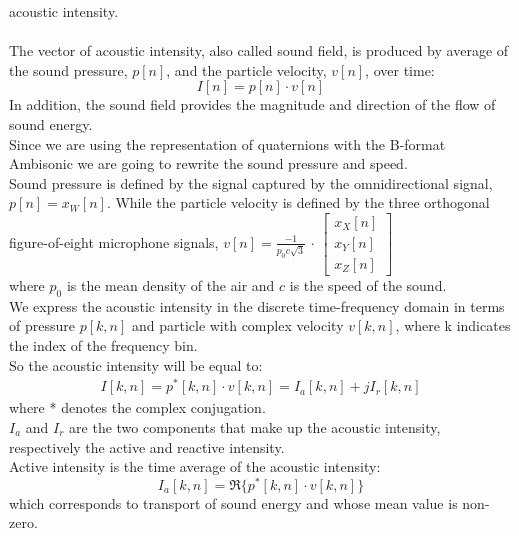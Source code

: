 \documentclass{article}
\begin{document}
    acoustic intensity.
    \\ \\ The vector of acoustic intensity, also called sound field, is produced by average of the sound pressure, $p[n]$, and
    the particle velocity, $v[n]$, over time:
    \begin{equation*}
        I[n]=p[n] \cdot v[n]
    \end{equation*}
    In addition, the sound field provides the magnitude and direction of the flow of sound energy.
    \\ Since we are using the representation of quaternions with the B-format Ambisonic we are going to rewrite the sound 
    pressure and speed.
    \\ Sound pressure is defined by the signal captured by the omnidirectional signal, $p[n] = x_W[n]$.
    While the particle velocity is defined by the three orthogonal figure-of-eight microphone signals, $v[n]= \frac{-1}{p_0c\sqrt{3}}$ $\cdot$
    $\begin{bmatrix}
            x_X[n] \\
            x_Y[n] \\
            x_Z[n]
        \end{bmatrix}
    $
    \\ where $p_0$ is the mean density of the air and $c$ is the speed of the sound.
    \\ We express the acoustic intensity in the discrete time-frequency domain in terms of pressure $p[k,n]$ and particle with complex
    velocity $v[k, n]$, where k indicates the index of the frequency bin.
    \\ So the acoustic intensity will be equal to:
    \begin{equation*}
        \begin{matrix}
            I[k,n] = p^*[k,n] \cdot v[k,n] = I_a[k,n]+jI_r[k,n]
        \end{matrix}
    \end{equation*}
    where * denotes the complex conjugation.
    \\ $I_a$ and $I_r$ are the two components that make up the acoustic intensity, respectively the active and reactive intensity.
    \\ Active intensity is the time average of the acoustic intensity:
    \begin{equation*}
        I_a [k,n]= \Re\{ p^*[k,n]\cdot v[k,n]\} 
    \end{equation*}
    which corresponds to transport of sound energy and whose mean value is non-zero.
\end{document}
